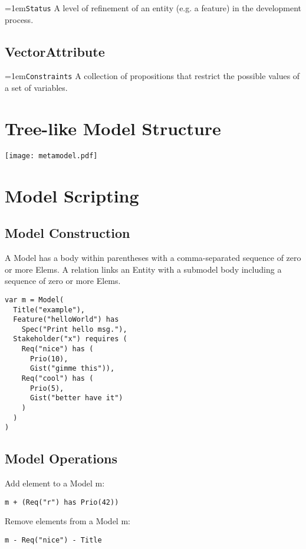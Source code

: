 \documentclass[9pt,a4paper,oneside]{report}
\begin{document}
\begin{multicols*}{4}
\hangindent=1em\lstinline+Status+ A level of refinement of an entity (e.g. a feature) in the development process. 

\subsection*{VectorAttribute}

\hangindent=1em\lstinline+Constraints+ A collection of propositions that restrict the possible values of a set of variables.

\vspace{2em}
\section*{Tree-like Model Structure}

\texttt{[image: metamodel.pdf]}

\vspace{2em}
\section*{Model Scripting}
\subsection*{Model Construction}
A Model has a body within parentheses with a comma-separated sequence of zero or more Elems. A relation links an Entity with a submodel body including a sequence of zero or more Elems.
\begin{lstlisting}
var m = Model(  
  Title("example"), 
  Feature("helloWorld") has 
    Spec("Print hello msg."),
  Stakeholder("x") requires (
    Req("nice") has (
      Prio(10),
      Gist("gimme this")),
    Req("cool") has (
      Prio(5),
      Gist("better have it")
    )
  )
)   
\end{lstlisting}

\subsection*{Model Operations}

Add element to a Model m: 
\begin{lstlisting}
m + (Req("r") has Prio(42))
\end{lstlisting}

Remove elements from a Model m:
\begin{lstlisting}
m - Req("nice") - Title
\end{lstlisting}


\end{multicols*}
\end{document}
